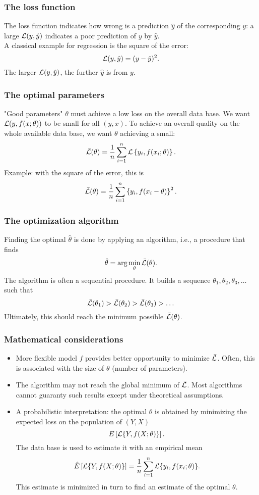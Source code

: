 \begin{frame}
\frametitle{The loss function}
The loss function indicates how wrong is a prediction $\hat{y}$ of the corresponding $y$: a large ${\cal L}(y,\hat{y})$ indicates a poor prediction of $y$ by $\hat{y}$.\\
\vspace{0.3cm} 
A classical example for regression is the square of the error:
$$
{\cal L}(y,\hat{y}) = (y-\hat{y})^2.
$$ 
The larger ${\cal L}(y,\hat{y})$, the further $\hat{y}$ is from $y$.
\end{frame}
\begin{frame}
\frametitle{The optimal parameters}
"Good parameters" $\theta$ must achieve a low loss on the overall data base. We want ${\cal L}(y,f(x;\theta))$ to be small for all $(y,x)$. To achieve an overall quality on the whole available data base, we want $\theta$ achieving a small:
$$
\bar{{\cal L}}(\theta) = \frac{1}{n}\sum_{i=1}^n {\cal L}\left\{y_i, f(x_i;\theta)\right\}.
$$
Example: with the square of the error, this is 
$$
\bar{{\cal L}}(\theta) = \frac{1}{n}\sum_{i=1}^n \left\{y_i, f(x_i-\theta)\right\}^2.
$$
\end{frame}
\begin{frame}
\frametitle{The optimization algorithm}
Finding the optimal $\hat{\theta}$ is done by applying an algorithm, i.e., a procedure that finds 
$$
\hat{\theta} = \arg\min_{\theta} \bar{{\cal L}}(\theta).
$$
The algorithm is often a sequential procedure. It builds a sequence $\theta_1, \theta_2, \theta_3, \ldots$ such that
$$
\bar{{\cal L}}(\theta_1) > \bar{{\cal L}}(\theta_2) > \bar{{\cal L}}(\theta_3) > \ldots 
$$
Ultimately, this should reach the minimum possible $\bar{{\cal L}}(\theta)$.
\end{frame}
\begin{frame}
\frametitle{Mathematical considerations}
\small
\begin{itemize}
\item More flexible model $f$ provides better opportunity to minimize $\bar{{\cal L}}$. Often, this is associated with the size of $\theta$ (number of parameters).
\item The algorithm may not reach the global minimum of $\bar{{\cal L}}$. Most algorithms cannot guaranty such results except under theoretical assumptions.
\item A probabilistic interpretation: the optimal $\theta$ is obtained by minimizing the expected loss on the population of $(Y,X)$
$$
E\left[{\cal L}\{Y, f(X;\theta)\}\right].
$$
The data base is used to estimate it with an empirical mean
$$
\hat{E}\left[{\cal L}\{Y, f(X;\theta)\}\right] = \frac{1}{n}\sum_{i=1}^n {\cal L}\{y_i, f(x_i;\theta)\}.
$$
This estimate is minimized in turn to find an estimate of the optimal $\theta$.
\end{itemize}
\normalsize
\end{frame}



